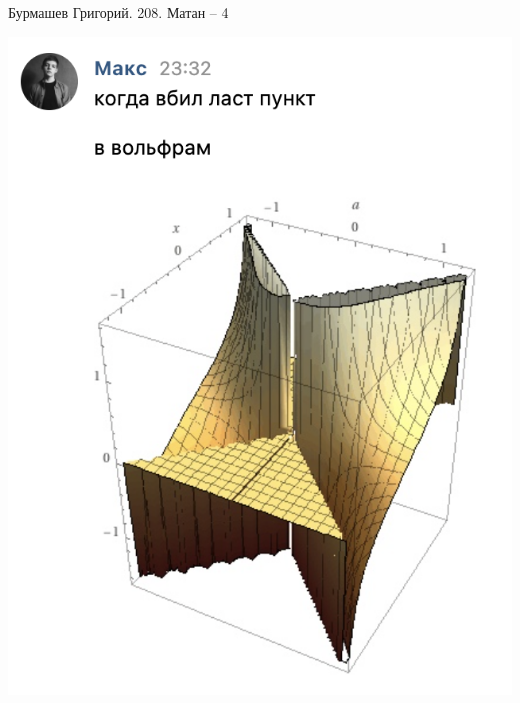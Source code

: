 \documentclass[a4paper,12pt]{article}
\author{Бурмашев Григорий, БПМИ-208}
\title{}
\date{\today}
\begin{document}
{\Large \begin{center}
Бурмашев Григорий. 208. Матан -- 4
\end{center}}
\begin{center}
\includegraphics[scale=1]{a.png}
\end{center}
\end{document}
